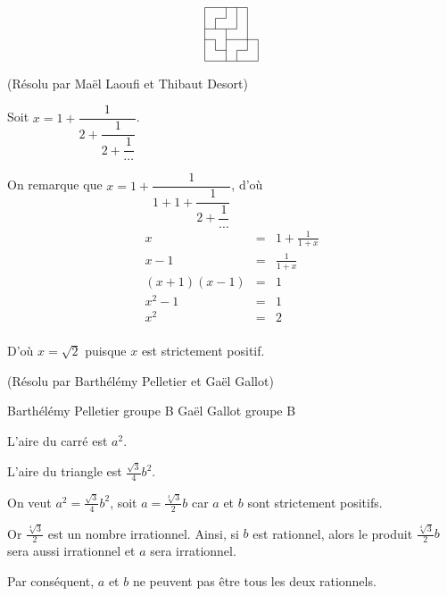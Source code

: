 \begin{sol}[34]
\[\begin{tikzpicture}[scale=0.3]
\draw (0, 0)--(0,5 );
\draw (1, 1)--(1,2 );
\draw (1, 3)--(1,4 );
\draw (2, 0)--(2,3 );
\draw (2, 4)--(2,5 );
\draw (3, 0)--(3,1 );
\draw (3, 3)--(3,5 );
\draw (4, 1)--(4,5 );
\draw (5, 0)--(5,2 );

\draw(0,0)--(5,0);
\draw(1,1)--(2,1);
\draw(3,1)--(4,1);
\draw(0,2)--(1,2);
\draw(2,2)--(5,2);
\draw(0,3)--(3,3);
\draw(1,4)--(2,4);
\draw(0,5)--(4,5);
\end{tikzpicture}\]

\end{sol}

\begin{sol}[42](Résolu par Maël Laoufi et Thibaut Desort)

Soit $x=1+\dfrac{1}{2+\dfrac{1}{2+\dfrac{1}{\cdots}}}$.

On remarque que $x=1+\dfrac{1}{1+1+\dfrac{1}{2+\dfrac{1}{\cdots}}}$, 
d'où 
\begin{eqnarray*}
x &=& 1+\frac{1}{1+x} \\
x-1 &=& \frac{1}{1+x}\\
(x+1)(x-1) &=& 1\\
x^2-1 &=& 1\\
x^2 &=& 2\\
\end{eqnarray*}

D'où $x=\sqrt{2}$ puisque $x$ est strictement positif.


\end{sol}


\begin{sol}[56](Résolu par Barthélémy Pelletier et Gaël Gallot)

Barthélémy Pelletier groupe B
Gaël Gallot groupe B

L'aire du carré est $a^2$.

L'aire du triangle est $\frac{\sqrt{3}}{4}b^2$.

On veut $a^2=\frac{\sqrt{3}}{4}b^2$, soit $a=\frac{\sqrt[4]{3}}{2}b$ car $a$ et $b$ sont strictement positifs.

Or $\frac{\sqrt[4]{3}}{2}$ est un nombre irrationnel.
Ainsi, si $b$ est rationnel, alors le produit $\frac{\sqrt[4]{3}}{2}b$ sera aussi irrationnel et $a$ sera irrationnel.

Par conséquent, $a$ et $b$ ne peuvent pas être tous les deux rationnels.

\end{sol}



